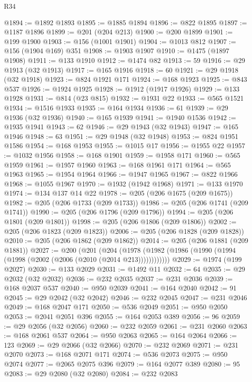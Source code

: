 \begin{lexlean}{R34}
\begin{coremodule}
@1894 := @1892 @1893
@1895 := @1885 @1894
@1896 := @822 @1895
@1897 := @1187 @1896
@1899 := @201 (@204 @213)
@1900 := @200 @1899
@1901 := @199 @1900
@1903 := @156 (@1001 @1901)
@1904 := @1013 @812
@1907 := @156 (@1904 @169) @351
@1908 := @1903 @1907
@1910 := @1475 (@1897 @1908)
@1911 := @133 @1910
@1912 := @1474 @82
@1913 := 59
@1916 := @29 @1913 (@32 @1913)
@1917 := @165 @1916
@1918 := 60
@1921 := @29 @1918 (@32 @1918)
@1923 := @824 @1921 @171
@1924 := @168 @1923
@1925 := @843 @537
@1926 := @1924 @1925
@1928 := @1912 (@1917 @1926)
@1929 := @133 @1928
@1931 := @814 (@23 @815)
@1932 := @1931 @22
@1933 := @565 @1521
@1934 := @1516 @1933
@1935 := @164 @1934
@1936 := 61
@1939 := @29 @1936 (@32 @1936)
@1940 := @165 @1939
@1941 := @1940 @1536
@1942 := @1935 @1941
@1943 := 62
@1946 := @29 @1943 (@32 @1943)
@1947 := @165 @1946
@1948 := 63
@1951 := @29 @1948 (@32 @1948)
@1953 := @824 @1951 @1586
@1954 := @168 @1953
@1955 := @1015 @17
@1956 := @1955 @22
@1957 := @1032 @1956
@1958 := @168 @1901
@1959 := @1958 @171
@1960 := @565 @1959
@1961 := @1957 @1960
@1963 := @168 @1961 @171
@1964 := @565 @1963
@1965 := @1954 @1964
@1966 := @1947 @1965
@1967 := @822 @1966
@1968 := @1055 @1967
@1970 := @1932 (@1942 @1968)
@1971 := @133 @1970
@1974 := @134 @137 @14 @22
@1978 := @205 (@206 @1675 (@209 @1675))
@1982 := @205 (@206 @1733 (@209 @1733))
@1986 := @205 (@206 @1741 (@209 @1741))
@1990 := @205 (@206 @1796 (@209 @1796))
@1994 := @205 (@206 @1801 (@209 @1801))
@1998 := @205 (@206 @1806 (@209 @1806))
@2002 := @205 (@206 @1823 (@209 @1823))
@2006 := @205 (@206 @1828 (@209 @1828))
@2010 := @205 (@206 @1862 (@209 @1862))
@2014 := @205 (@206 @1881 (@209 @1881))
@2027 := @200
    (@201
      (@204 (@1978 (@1982 (@1986 (@1990 (@1994 (@1998 (@2002 (@2006 (@2010 (@2014 @213))))))))))))
@2029 := @1974 (@199 @2027)
@2030 := @133 @2029
@2031 := @1492 @11
@2032 := 64
@2035 := @29 @2032 (@32 @2032)
@2036 := @232 @2035
@2037 := @231 @2036
@2039 := @168 @2037 @537
@2040 := @950 @2039
@2041 := @164 @2040
@2042 := 91
@2045 := @29 @2042 (@32 @2042)
@2046 := @232 @2045
@2047 := @231 @2046
@2049 := @168 @2047 @171
@2050 := @536 @2049
@2051 := @950 @2050
@2053 := @2041 @2051 @396
@2055 := @164 @2053 @389
@2056 := 96
@2059 := @29 @2056 (@32 @2056)
@2060 := @232 @2059
@2061 := @231 @2060
@2063 := @168 @2061 @537
@2064 := @950 @2063
@2065 := @164 @2064
@2066 := 123
@2069 := @29 @2066 (@32 @2066)
@2070 := @232 @2069
@2071 := @231 @2070
@2073 := @168 @2071 @171
@2074 := @536 @2073
@2075 := @950 @2074
@2077 := @2065 @2075 @396
@2079 := @164 @2077 @389
@2080 := 95
@2083 := @29 @2080 (@32 @2080)
@2084 := @232 @2083

\end{coremodule}
\end{lexlean}
